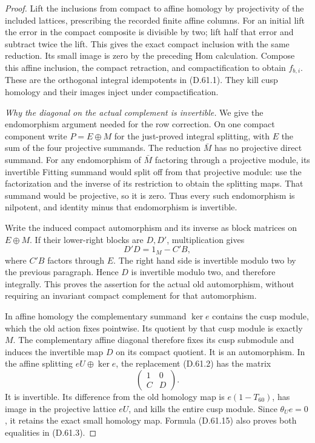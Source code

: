 \begin{proof}
Lift the inclusions from compact to
affine homology by projectivity of
the included lattices, prescribing
the recorded finite affine columns.
For an initial lift the error in
the compact composite is divisible
by two; lift half that error and
subtract twice the lift. This gives
the exact compact inclusion with
the same reduction. Its small
image is zero by the preceding
Hom calculation. Compose this
affine inclusion, the compact
retraction, and compactification
to obtain \(f_{b,i}\). These are
the orthogonal integral idempotents
in (D.61.1). They kill cusp
homology and their images inject
under compactification.

\emph{Why the diagonal on the actual complement is invertible.}
We give the endomorphism argument
needed for the row correction.
On one compact component write
\(P=E\oplus M\) for the just-proved
integral splitting, with \(E\)
the sum of the four projective
summands. The reduction \(\bar M\)
has no projective direct summand.
For any endomorphism of \(\bar M\)
factoring through a projective module,
its invertible Fitting summand would
split off from that projective module:
use the factorization and the inverse
of its restriction to obtain the
splitting maps. That summand would
be projective, so it is zero.
Thus every such endomorphism is
nilpotent, and identity minus that
endomorphism is invertible.

Write the induced compact automorphism
and its inverse as block matrices on
\(E\oplus M\). If their lower-right
blocks are \(D,D'\), multiplication
gives
\[
                         D'D=1_M-C'B,
 \tag{D.61.14}
\]
where \(C'B\) factors through \(E\).
The right hand side is invertible
modulo two by the previous paragraph.
Hence \(D\) is invertible modulo
two, and therefore integrally.
This proves the assertion for the
actual old automorphism, without
requiring an invariant compact
complement for that automorphism.

In affine homology the complementary
summand \(\ker e\) contains the cusp
module, which the old action fixes
pointwise. Its quotient by that
cusp module is exactly \(M\).
The complementary affine diagonal
therefore fixes its cusp submodule
and induces the invertible map \(D\)
on its compact quotient. It is an
automorphism. In the affine splitting
\(eU\oplus\ker e\), the replacement
(D.61.2) has the matrix
\[
                    \begin{pmatrix}1&0\\ C&D\end{pmatrix}.
 \tag{D.61.15}
\]
It is invertible. Its difference from
the old homology map is
\(e(1-T_{60})\), has image in the
projective lattice \(eU\), and kills
the entire cusp module. Since
\(\theta_Ue=0\), it retains the
exact small homology map. Formula
(D.61.15) also proves both equalities
in (D.61.3).


\end{proof}
